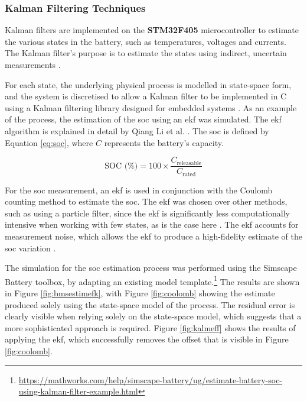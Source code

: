 \subsubsection{Kalman Filtering Techniques}
\label{kalm}

Kalman filters are implemented on the \textbf{STM32F405} microcontroller to estimate the various states in the battery, such as temperatures, voltages and currents. The Kalman filter's purpose is to estimate the states using indirect, uncertain measurements \cite{kalfilt}. 

For each state, the underlying physical process is modelled in state-space form, and the system is discretised to allow a Kalman filter to be implemented in C using a Kalman filtering library designed for embedded systems \cite{computers11110165}. As an example of the process, the estimation of the \gls{soc} using an \gls{ekf} was simulated. The \gls{ekf} algorithm is explained in detail by Qiang Li et al. \cite{kalfilt}.  The \gls{soc} is defined by Equation \ref{eq:soc}, where $C$ represents the battery's capacity.

\begin{equation}
\label{eq:soc}
\text{SOC (\%)} = 100 \times \frac{C_{\text{releasable}}}{C_{\text{rated}}}
\end{equation}

For the \gls{soc} measurement, an \gls{ekf} is used in conjunction with the Coulomb counting method to estimate the \gls{soc}. The \gls{ekf} was chosen over other methods, such as using a particle filter, since the \gls{ekf} is significantly less computationally intensive when working with few states, as is the case here \cite{STELZER20171483}. The \gls{ekf} accounts for measurement noise, which allows the \gls{ekf} to produce a high-fidelity estimate of the \gls{soc} variation \cite{Zaki2025}.

 The simulation for the \gls{soc} estimation process was performed using the Simscape Battery toolbox, by adapting an existing model template.\footnote{\url{https://mathworks.com/help/simscape-battery/ug/estimate-battery-soc-using-kalman-filter-example.html}} The results are shown in Figure \ref{fig:bmsestimefk}, with Figure \ref{fig:coolomb} showing the estimate produced solely using the state-space model of the process. The residual error is clearly visible when relying solely on the state-space model, which suggests that a more sophisticated approach is required. Figure \ref{fig:kalmeff} shows the results of applying the \gls{ekf}, which successfully removes the offset that is visible in Figure \ref{fig:coolomb}.


